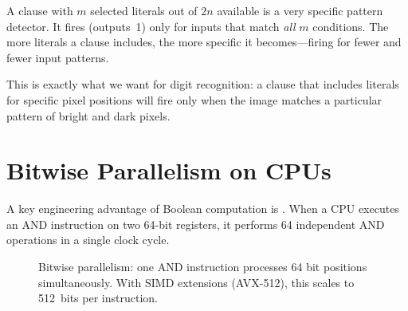 A clause with $m$ selected literals out of $2n$ available is a very
specific pattern detector. It fires (outputs~1) only for inputs that
match \emph{all} $m$ conditions. The more literals a clause includes,
the more specific it becomes---firing for fewer and fewer input
patterns.

This is exactly what we want for digit recognition: a clause that
includes literals for specific pixel positions will fire only when the
image matches a particular pattern of bright and dark pixels.


\section{Bitwise Parallelism on CPUs}
\label{sec:bitwise-parallel}

A key engineering advantage of Boolean computation is
. When a CPU executes an AND instruction
on two 64-bit registers, it performs 64 independent AND operations in
a single clock cycle.

\begin{figure}[htbp]
\centering
{}
\caption{Bitwise parallelism: one AND instruction processes 64 bit
  positions simultaneously. With SIMD extensions (AVX-512), this
  scales to 512~bits per instruction.}
\label{fig:bitwise-parallel}
\end{figure}

